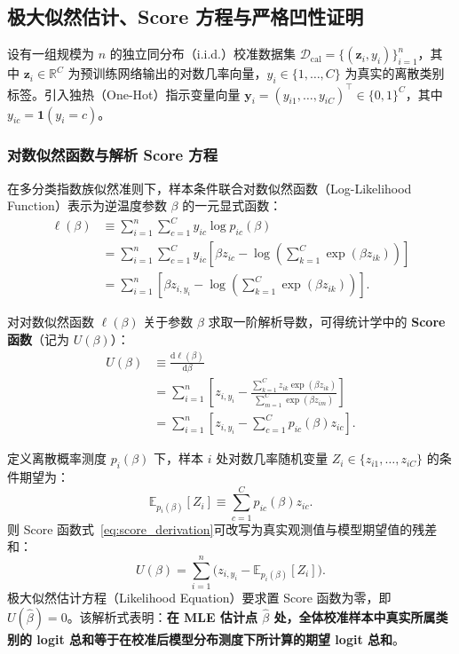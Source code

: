 \subsection{极大似然估计、Score 方程与严格凹性证明}

设有一组规模为 $n$ 的独立同分布（i.i.d.）校准数据集 $\mathcal{D}_{\mathrm{cal}} = \{(\boldsymbol{z}_i, y_i)\}_{i=1}^n$，其中 $\boldsymbol{z}_i \in \mathbb{R}^C$ 为预训练网络输出的对数几率向量，$y_i \in \{1, \dots, C\}$ 为真实的离散类别标签。引入独热（One-Hot）指示变量向量 $\boldsymbol{y}_i = (y_{i1}, \dots, y_{iC})^\top \in \{0, 1\}^C$，其中 $y_{ic} = \mathbf{1}(y_i = c)$。

\subsubsection{对数似然函数与解析 Score 方程}

在多分类指数族似然准则下，样本条件联合对数似然函数（Log-Likelihood Function）表示为逆温度参数 $\beta$ 的一元显式函数：
\begin{align}
\ell(\beta) &\equiv \sum_{i=1}^n \sum_{c=1}^C y_{ic} \log p_{ic}(\beta) \nonumber\\
&= \sum_{i=1}^n \sum_{c=1}^C y_{ic} \left[ \beta z_{ic} - \log \left( \sum_{k=1}^C \exp(\beta z_{ik}) \right) \right] \nonumber\\
&= \sum_{i=1}^n \left[ \beta z_{i, y_i} - \log \left( \sum_{k=1}^C \exp(\beta z_{ik}) \right) \right]. \label{eq:full_loglik}
\end{align}

对对数似然函数 $\ell(\beta)$ 关于参数 $\beta$ 求取一阶解析导数，可得统计学中的 \textbf{Score 函数}（记为 $U(\beta)$）：
\begin{align}
U(\beta) &\equiv \frac{\mathrm{d}\ell(\beta)}{\mathrm{d}\beta} \nonumber\\
&= \sum_{i=1}^n \left[ z_{i, y_i} - \frac{\sum_{k=1}^C z_{ik} \exp(\beta z_{ik})}{\sum_{m=1}^C \exp(\beta z_{im})} \right] \nonumber\\
&= \sum_{i=1}^n \left[ z_{i, y_i} - \sum_{c=1}^C p_{ic}(\beta) z_{ic} \right]. \label{eq:score_derivation}
\end{align}

定义离散概率测度 $p_i(\beta)$ 下，样本 $i$ 处对数几率随机变量 $Z_i \in \{z_{i1}, \dots, z_{iC}\}$ 的条件期望为：
\begin{equation}\label{eq:conditional_expectation}
\mathbb{E}_{p_i(\beta)}[Z_i] \equiv \sum_{c=1}^C p_{ic}(\beta) z_{ic}.
\end{equation}
则 Score 函数式~\eqref{eq:score_derivation}可改写为真实观测值与模型期望值的残差和：
\begin{equation}\label{eq:score_clean}
U(\beta) = \sum_{i=1}^n \Big( z_{i, y_i} - \mathbb{E}_{p_i(\beta)}[Z_i] \Big).
\end{equation}
极大似然估计方程（Likelihood Equation）要求置 Score 函数为零，即 $U(\hat\beta) = 0$。该解析式表明：\textbf{在 MLE 估计点 $\hat\beta$ 处，全体校准样本中真实所属类别的 logit 总和等于在校准后模型分布测度下所计算的期望 logit 总和}。


